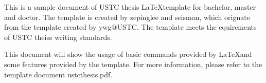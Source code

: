 ﻿\begin{abstract}
本文是中国科学技术大学本硕博毕业论文 \LaTeX 模板示例文件。本模板由
zepinglee和seisman创建，其前身是ywg@USTC创建的本硕博论文通用模板。
本模板遵循中国科学技术大学的论文写作规范，适用于撰写学士、硕士和博士学位论文。

本示例文档中会演示如何使用 \LaTeX 的一些基本命令以及本模板提供的一些特殊功能，
模板的选项及详细用法请参考模板说明文档 ustcthesis.pdf。

\end{abstract}

\begin{enabstract}
This is a sample document of USTC thesis \LaTeX template for bachelor, master
and doctor. The template is created by zepinglee and seisman, which orignate from
the template created by ywg@USTC. The template meets the equirements of USTC
theiss writing standards.

This document will show the usage of basic commands provided by \LaTeX and some
features provided by the template. For more information, please refer to the
template document ustcthesis.pdf.

\end{enabstract}
